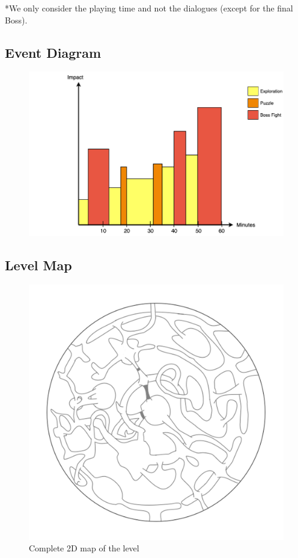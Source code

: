 *We only consider the playing time and not the dialogues (except for the final Boss).\\


\subsection{Event Diagram}

\begin{figure}[H]
	\centering
	\includegraphics[width=0.8\linewidth]{images/graphs/event_diagram.png}
\end{figure}

\subsection{Level Map}

\begin{figure}[H]
	\centering
	\includegraphics[width=0.6\linewidth]{images/map/map_clear.png}
	\caption*{Complete 2D map of the level}
\end{figure}

